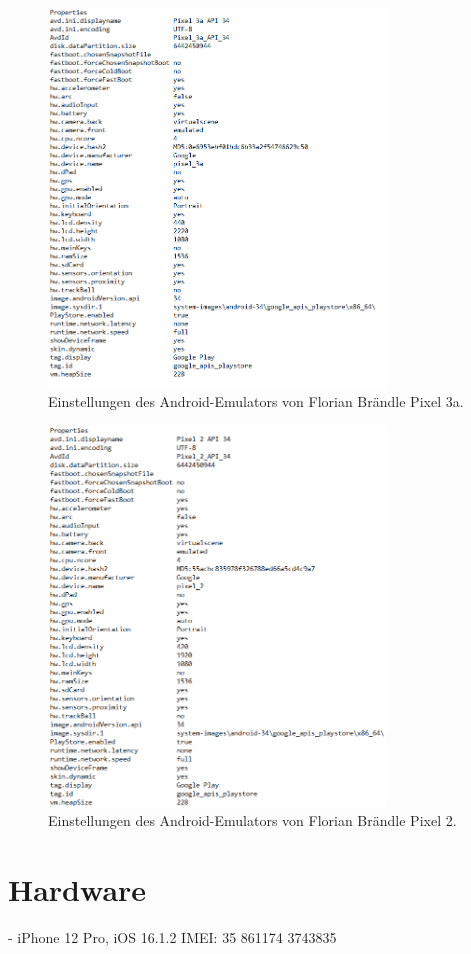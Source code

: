 \begin{figure}[H]
  \centering
  \includegraphics[width=0.8\textwidth]{images/android_emu_fb_1.png}
  \caption{Einstellungen des Android-Emulators von Florian Brändle Pixel 3a.}
\end{figure}

\begin{figure}[H]
  \centering
  \includegraphics[width=0.8\textwidth]{images/android_emu_fb_2.png}
  \caption{Einstellungen des Android-Emulators von Florian Brändle Pixel 2.}
\end{figure}

\section{Hardware}

-	iPhone 12 Pro, iOS 16.1.2
IMEI: 35 861174 3743835

